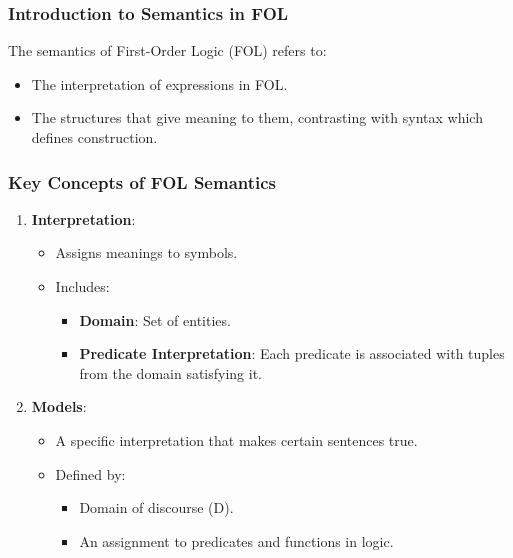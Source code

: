\documentclass[aspectratio=169]{beamer}
\begin{document}
\begin{frame}[fragile]
    \frametitle{Introduction to Semantics in FOL}
    The semantics of First-Order Logic (FOL) refers to:
    \begin{itemize}
        \item The interpretation of expressions in FOL.
        \item The structures that give meaning to them, contrasting with syntax which defines construction.
    \end{itemize}
\end{frame}

\begin{frame}[fragile]
    \frametitle{Key Concepts of FOL Semantics}
    \begin{enumerate}
        \item \textbf{Interpretation}:
        \begin{itemize}
            \item Assigns meanings to symbols.
            \item Includes:
            \begin{itemize}
                \item \textbf{Domain}: Set of entities.
                \item \textbf{Predicate Interpretation}: Each predicate is associated with tuples from the domain satisfying it.
            \end{itemize}
        \end{itemize}
        \item \textbf{Models}:
        \begin{itemize}
            \item A specific interpretation that makes certain sentences true.
            \item Defined by:
            \begin{itemize}
                \item Domain of discourse (D).
                \item An assignment to predicates and functions in logic.
            \end{itemize}
        \end{itemize}
    \end{enumerate}
\end{frame}
\end{document}
